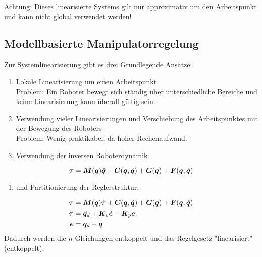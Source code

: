 		Achtung: Dieses linearisierte Systems gilt nur approximativ um den Arbeitspunkt und kann nicht global verwendet werden!

	\subsection{Modellbasierte Manipulatorregelung}
		Zur Systemlinearisierung gibt es drei Grundlegende Ansätze:
		\begin{enumerate}
			\item Lokale Linearisierung um einen Arbeitspunkt \\ Problem: Ein Roboter bewegt sich ständig über unterschiedliche Bereiche und keine Linearisierung kann überall gültig sein.
			\item Verwendung vieler Linearisierungen und Verschiebung des Arbeitspunktes mit der Bewegung des Roboters \\ Problem: Wenig praktikabel, da hoher Rechenaufwand.
			\item Verwendung der inversen Roboterdynamik
		\end{enumerate}
		\begin{equation*}
			\bm{\tau} = \bm{M}(\bm{q}) \ddot{\bm{q}} + \bm{C}(\bm{q}, \dot{\bm{q}}) + \bm{G}(\bm{q}) + \bm{F}(\bm{q}, \dot{\bm{q}})
		\end{equation*}
		\begin{enumerate}
			\item[] und Partitionierung der Reglerstruktur:
		\end{enumerate}
		\vspace{-0.5cm}
		\begin{align*}
			\bm{\tau}       & = \bm{M}(\bm{q})\hat{\bm{\tau}} + \bm{C}(\bm{q}, \dot{\bm{q}}) + \bm{G}(\bm{q}) + \bm{F}(\bm{q}, \dot{\bm{q}}) \\
			\hat{\bm{\tau}} & = \ddot{\bm{q}}_d + \bm{K}_v \dot{\bm{e}} + \bm{K}_p \bm{e}                                                          \\
			\bm{e}          & = \bm{q}_d - \bm{q}
		\end{align*}
		Dadurch werden die \(n\) Gleichungen entkoppelt und das Regelgesetz "linearisiert" (entkoppelt).


